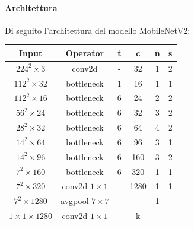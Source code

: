         \paragraph{Architettura}
        Di seguito l'architettura del modello MobileNetV2:
            \begin{table}[!h]
                \centering
                \begin{tabular}{|c|c|c|c|c|c|}
                    \hline
                    \textbf{Input} & \textbf{Operator} & \textbf{t} & \textbf{c} & \textbf{n} & \textbf{s}\\
                    \hline \hline
                    \rule[-3mm]{0mm}{8mm}
                    $224^2 \times 3$ & conv2d & - & 32 & 1 & 2\\
                    \hline
                    \rule[-3mm]{0mm}{8mm}
                    $112^2 \times 32 $& bottleneck & 1 & 16 & 1 & 1 \\
                    \hline
                    \rule[-3mm]{0mm}{8mm}
                    $112^2 \times 16$ & bottleneck & 6 & 24 & 2 & 2 \\
                    \hline
                    \rule[-3mm]{0mm}{8mm}
                    $56^2 \times 24$ & bottleneck & 6 & 32 & 3 & 2\\
                    \hline
                    \rule[-3mm]{0mm}{8mm}
                    $28^2 \times 32$ & bottleneck & 6& 64 & 4 & 2\\
                    \hline
                    \rule[-3mm]{0mm}{8mm}
                    $14^2 \times 64 $ & bottleneck & 6 & 96 & 3 & 1\\
                    \hline
                    \rule[-3mm]{0mm}{8mm}
                    $14^2 \times 96$ & bottleneck & 6 & 160 & 3 & 2\\
                    \hline
                    \rule[-3mm]{0mm}{8mm}
                    $7^2 \times 160$ & bottleneck & 6 & 320 & 1 & 1\\
                    \hline
                    \rule[-3mm]{0mm}{8mm}
                    $7^2 \times 320 $ & conv2d $1\times1$ & - & 1280 & 1 & 1\\
                    \hline
                    \rule[-3mm]{0mm}{8mm}
                    $7^2 \times 1280 $ & avgpool $7\times7$ & - & - & 1 & -\\
                    \hline
                    \rule[-3mm]{0mm}{8mm}
                    $1 \times 1 \times 1280$ & conv2d $1\times1$ & - & k & - & \\
                    \hline
                \end{tabular}
                \label{MobileNetV2 Architecture}
            \end{table}
        \newpage
        
